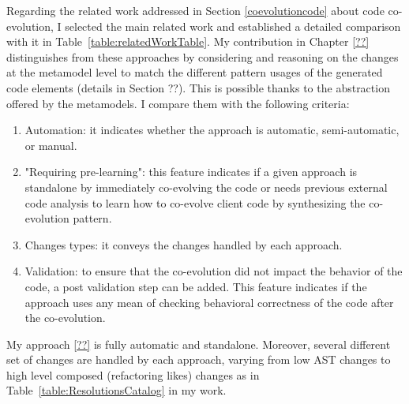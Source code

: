   Regarding the related work addressed in Section \ref{coevolutioncode} about code co-evolution, I selected the main related work and established a detailed comparison with it in Table~\ref{table:relatedWorkTable}. My contribution in Chapter \ref{??} distinguishes from these approaches by considering and reasoning on the changes at the metamodel level to match the different pattern usages of the generated code elements (details in Section ??). This is possible thanks to the abstraction offered by the metamodels. 
  I compare them with the following criteria: %
  
  \begin{enumerate}
  	
  	\item Automation: it indicates whether the approach is automatic, semi-automatic, or manual.
  	\item "Requiring pre-learning": 
  	this feature indicates if a given approach is standalone by immediately co-evolving the code or needs previous external code analysis to learn how to co-evolve client code by synthesizing the co-evolution pattern.
  	\item Changes types: it conveys the changes handled by each approach.
  	\item Validation: to ensure that the co-evolution did not impact the behavior of the code, a post validation step can be added. This feature indicates if the approach uses any mean of checking behavioral correctness of the code after the co-evolution.
  
  \end{enumerate}
  
   My approach \ref{??} is fully automatic and standalone. Moreover, several different set of changes are handled by each approach, varying from low AST changes to high level composed (refactoring likes) changes as in Table~\ref{table:ResolutionsCatalog} in my work. 
  
